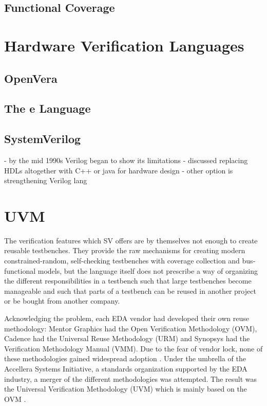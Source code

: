 \documentclass[12pt]{book}
\begin{document}
\subsection{Functional Coverage}

\section{Hardware Verification Languages} %

\subsection{OpenVera}

\cite[Sec. 7, pp. 51-??]{flake2020a}

\subsection{The e Language}

\subsection{SystemVerilog}

\cite[Sec. 6, pp. 43]{flake2020a}
- by the mid 1990s Verilog began to show its limitations 
- discussed replacing HDLs altogether with C++ or java for hardware design
- other option is strengthening Verilog lang

\section{UVM} %

The verification features which SV offers are by themselves not enough to create reusable testbenches. They provide the raw mechanisms for creating modern constrained-random, self-checking testbenches with coverage collection and bus-functional models, but the language itself does not prescribe a way of organizing the different responsibilities in a testbench such that large testbenches become manageable and such that parts of a testbench can be reused in another project or be bought from another company. 

Acknowledging the problem, each EDA vendor had developed their own reuse methodology: Mentor Graphics had the Open Verification Methodology (OVM), Cadence had the Universal Reuse Methodology (URM) and Synopsys had the Verification Methodology Manual (VMM). Due to the fear of vendor lock, none of these methodologies gained widespread adoption \cite[ch. 4]{mehta2018asic}. Under the umbrella of the Accellera Systems Initiative, a standards organization supported by the EDA industry, a merger of the different methodologies was attempted. The result was the Universal Verification Methodology (UVM) which is mainly based on the OVM \cite[ch. 4]{mehta2018asic}. 
\end{document}
